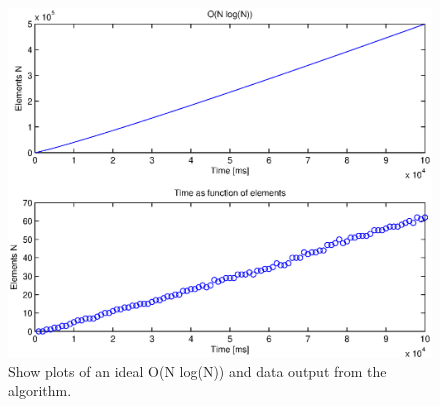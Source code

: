 \begin{figure}[th!]
\centering
\includegraphics[width=1\textwidth]{./graphics/test2.eps}
\caption{Show plots of an ideal O(N log(N)) and data output from the algorithm.}
\label{fig:test2}
\end{figure}